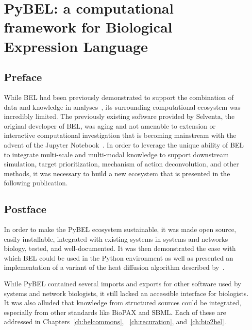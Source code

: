 \chapter{PyBEL: a computational framework for Biological Expression Language}
\label{ch:pybel}

\section*{Preface}

While \ac{BEL} had been previously demonstrated to support the combination of data and knowledge in analyses~\cite{Martin2012,Laifenfeld2012,Catlett2013,Martin2014,Vasilyev2014,Laifenfeld2014}, its surrounding computational ecosystem was incredibly limited.
The previously existing software provided by Selventa, the original developer of BEL, was aging and not amenable to extension or interactive computational investigation that is becoming mainstream with the advent of the Jupyter Notebook~\cite{Kluyver2016}.
In order to leverage the unique ability of \ac{BEL} to integrate multi-scale and multi-modal knowledge to support downstream simulation, target prioritization, mechanism of action deconvolution, and other methods, it was necessary to build a new ecosystem that is presented in the following publication.

\vspace*{\fill}



\section*{Postface}

In order to make the PyBEL ecosystem sustainable, it was made open source, easily installable, integrated with existing systems in systems and networks biology, tested, and well-documented.
It was then demonstrated the ease with which \ac{BEL} could be used in the Python environment as well as presented an implementation of a variant of the heat diffusion algorithm described by~\cite{Leiserson2015}.

While PyBEL contained several imports and exports for other software used by systems and network biologists, it still lacked an accessible interface for biologists.
It was also alluded that knowledge from structured sources could be integrated, especially from other standards like \ac{BioPAX} and \ac{SBML}.
Each of these are addressed in Chapters~\ref{ch:belcommons}, ~\ref{ch:recuration}, and~\ref{ch:bio2bel}.
